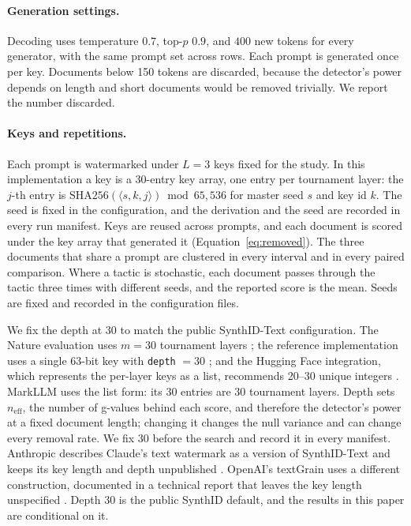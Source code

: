 \paragraph{Generation settings.}
Decoding uses temperature $0.7$, top-$p$ $0.9$, and $400$ new tokens for every generator, with the same prompt set across rows. Each prompt is generated once per key. Documents below 150 tokens are discarded, because the detector's power depends on length and short documents would be removed trivially. We report the number discarded.

\paragraph{Keys and repetitions.}
Each prompt is watermarked under $L = 3$ keys fixed for the study. In this implementation a key is a 30-entry key array, one entry per tournament layer: the $j$-th entry is $\mathrm{SHA256}(\langle s, k, j\rangle) \bmod 65{,}536$ for master seed $s$ and key id $k$. The seed is fixed in the configuration, and the derivation and the seed are recorded in every run manifest. Keys are reused across prompts, and each document is scored under the key array that generated it (Equation~\ref{eq:removed}). The three documents that share a prompt are clustered in every interval and in every paired comparison. Where a tactic is stochastic, each document passes through the tactic three times with different seeds, and the reported score is the mean. Seeds are fixed and recorded in the configuration files.

We fix the depth at 30 to match the public SynthID-Text configuration. The Nature evaluation uses $m = 30$ tournament layers \citep{synthidtext}; the reference implementation uses a single 63-bit key with \texttt{depth} $= 30$ \citep{synthidcode}; and the Hugging Face integration, which represents the per-layer keys as a list, recommends 20--30 unique integers \citep{synthidhf}. MarkLLM uses the list form: its 30 entries are 30 tournament layers. Depth sets $n_{\mathrm{eff}}$, the number of g-values behind each score, and therefore the detector's power at a fixed document length; changing it changes the null variance and can change every removal rate. We fix 30 before the search and record it in every manifest. Anthropic describes Claude's text watermark as a version of SynthID-Text and keeps its key length and depth unpublished \citep{anthropicwatermark}. OpenAI's textGrain uses a different construction, documented in a technical report that leaves the key length unspecified \citep{textgrainreport}. Depth 30 is the public SynthID default, and the results in this paper are conditional on it.

